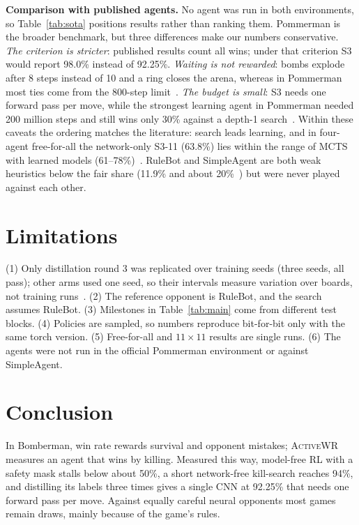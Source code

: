 \documentclass[runningheads]{llncs}
\newcommand{\awr}{\textsc{ActiveWR}}
\begin{document}
\textbf{Comparison with published agents.} No agent was run in both environments, so Table~\ref{tab:sota} positions results rather than ranking them. Pommerman is the broader benchmark, but three differences make our numbers conservative. \emph{The criterion is stricter}: published results count all wins; under that criterion S3 would report 98.0\% instead of 92.25\%. \emph{Waiting is not rewarded}: bombs explode after 8 steps instead of 10 and a ring closes the arena, whereas in Pommerman most ties come from the 800-step limit~\cite{weil2023}. \emph{The budget is small}: S3 needs one forward pass per move, while the strongest learning agent in Pommerman needed 200 million steps and still wins only 30\% against a depth-1 search~\cite{huynh2024,osogami2019}. Within these caveats the ordering matches the literature: search leads learning, and in four-agent free-for-all the network-only S3-11 (63.8\%) lies within the range of MCTS with learned models (61--78\%)~\cite{weil2023}. RuleBot and SimpleAgent are both weak heuristics below the fair share (11.9\% and about 20\%~\cite{resnick2018pommerman}) but were never played against each other.

\section{Limitations}
(1) Only distillation round 3 was replicated over training seeds (three seeds, all pass); other arms used one seed, so their intervals measure variation over boards, not training runs~\cite{henderson2018matters,agarwal2021precipice}. (2) The reference opponent is RuleBot, and the search assumes RuleBot. (3) Milestones in Table~\ref{tab:main} come from different test blocks. (4) Policies are sampled, so numbers reproduce bit-for-bit only with the same torch version. (5) Free-for-all and $11\times11$ results are single runs. (6) The agents were not run in the official Pommerman environment or against SimpleAgent.

\section{Conclusion}
In Bomberman, win rate rewards survival and opponent mistakes; \awr{} measures an agent that wins by killing. Measured this way, model-free RL with a safety mask stalls below about 50\%, a short network-free kill-search reaches 94\%, and distilling its labels three times gives a single CNN at 92.25\% that needs one forward pass per move. Against equally careful neural opponents most games remain draws, mainly because of the game's rules.
\end{document}
